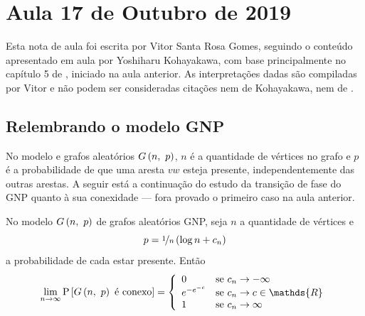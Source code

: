 \section{Aula 17 de Outubro de 2019}
\label{2019_10_17}

Esta nota de aula foi escrita por Vitor Santa Rosa Gomes, seguindo o conteúdo apresentado em aula por Yoshiharu Kohayakawa, com base principalmente no capítulo 5 de \cite[p.~245]{blum_hopcroft}, iniciado na aula anterior. As interpretações dadas são compiladas por Vitor e não podem ser consideradas citações nem de Kohayakawa, nem de \cite{blum_hopcroft}.

\subsection*{Relembrando o modelo GNP}

No modelo e grafos aleatórios $G\left(n,\ p\vphantom{1j}\right)$, $n$ é a quantidade de vértices no grafo e $p$ é a probabilidade de que uma aresta $vw$ esteja presente, independentemente das outras arestas. A seguir está a continuação do estudo da transição de fase do GNP quanto à sua conexidade --- fora provado o primeiro caso na aula anterior.

\begin{teorema}
  No modelo $G\left(n,\ p\vphantom{1j}\right)$ de grafos aleatórios GNP, seja $n$ a quantidade de vértices e 
  \[
    p = \nicefrac{1}{n}\left(\log n + c_n\vphantom{1j}\right)
  \]
  a probabilidade de cada estar presente. Então
  \vspace*{-\baselineskip}
  \[
    \lim_{n\rightarrow\infty} \mathrm{P}\left[G\left(n,\ p\vphantom{1j}\right) \text{ é conexo}\vphantom{1j}\right] = \left\{\begin{array}{ll}
      0                               & \text{se } c_n\rightarrow-\infty                            \\
      \mathrel{e}^{-\mathrel{e}^{-c}} & \text{se } c_n\rightarrow c\in\mathds{R}                    \\
      1                               & \text{se } c_n\rightarrow\infty                             \\
    \end{array}\vphantom{1j}\right.
  \]
\end{teorema}

